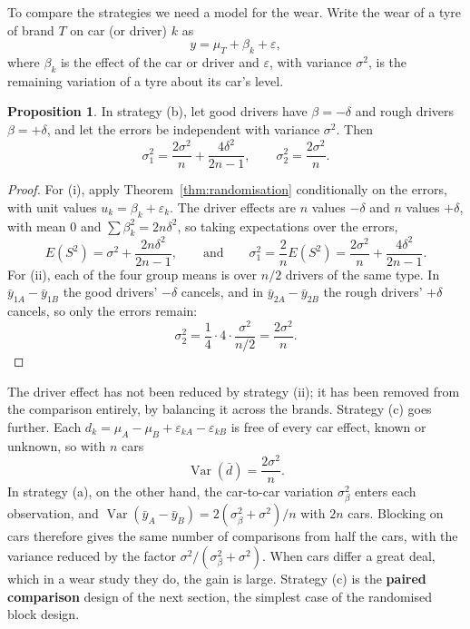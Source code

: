 \documentclass[11pt,a4paper]{article}
\numberwithin{equation}{section}
\DeclareMathOperator{\Var}{Var}
\theoremstyle{definition}
\newtheorem{prop}[thm]{Proposition}
\begin{document}
To compare the strategies we need a model for the wear. Write the wear of a tyre of brand $T$ on car (or driver) $k$ as
\[
y = \mu_T + \beta_k + \varepsilon ,
\]
where $\beta_k$ is the effect of the car or driver and $\varepsilon$, with variance $\sigma^2$, is the remaining variation of a tyre about its car's level.

\begin{prop}\label{prop:drivers}
In strategy (b), let good drivers have $\beta = -\delta$ and rough drivers $\beta = +\delta$, and let the errors be independent with variance $\sigma^2$. Then
\[
\sigma_1^2 = \frac{2\sigma^2}{n} + \frac{4\delta^2}{2n - 1} , \qquad \sigma_2^2 = \frac{2\sigma^2}{n} .
\]
\end{prop}

\begin{proof}
For (i), apply Theorem~\ref{thm:randomisation} conditionally on the errors, with unit values $u_k = \beta_k + \varepsilon_k$. The driver effects
are $n$ values $-\delta$ and $n$ values $+\delta$, with mean $0$ and $\sum\beta_k^2 = 2n\delta^2$, so taking expectations over the errors,
\[
E(S^2) = \sigma^2 + \frac{2n\delta^2}{2n - 1} , \qquad\text{and}\qquad \sigma_1^2 = \frac2nE(S^2) = \frac{2\sigma^2}{n} + \frac{4\delta^2}{2n - 1} .
\]
For (ii), each of the four group means is over $n/2$ drivers of the same type. In $\bar y_{1A} - \bar y_{1B}$ the good drivers' $-\delta$ cancels, and in
$\bar y_{2A} - \bar y_{2B}$ the rough drivers' $+\delta$ cancels, so only the errors remain:
\[
\sigma_2^2 = \frac14\cdot4\cdot\frac{\sigma^2}{n/2} = \frac{2\sigma^2}{n} .
\]
\end{proof}

The driver effect has not been reduced by strategy (ii); it has been removed from the comparison entirely, by balancing it across the brands.
Strategy (c) goes further. Each $d_k = \mu_A - \mu_B + \varepsilon_{kA} - \varepsilon_{kB}$ is free of every car effect, known or unknown, so with $n$ cars
\[
\Var(\bar d) = \frac{2\sigma^2}{n} .
\]
In strategy (a), on the other hand, the car-to-car variation $\sigma_\beta^2$ enters each observation, and $\Var(\bar y_A - \bar y_B) = 2(\sigma_\beta^2 + \sigma^2)/n$
with $2n$ cars. Blocking on cars therefore gives the same number of comparisons from half the cars, with the variance reduced by the factor
$\sigma^2/(\sigma_\beta^2 + \sigma^2)$. When cars differ a great deal, which in a wear study they do, the gain is large. Strategy (c) is the
\textbf{paired comparison} design of the next section, the simplest case of the randomised block design.
\end{document}
